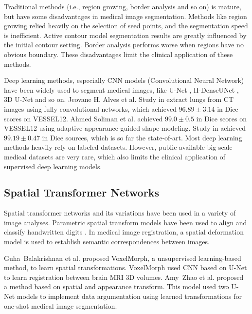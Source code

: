 \documentclass{article}
\begin{document}
Traditional methods (i.e., region growing, border analysis and so on) is mature, but have some disadvantages in medical image segmentation.
Methods like region growing \cite{adams1994seeded} relied heavily on the selection of seed points, and the segmentation speed is inefficient.
Active contour model \cite{kass1988snakes} segmentation results are greatly influenced by the initial contour setting.
Border analysis \cite{canny1987computational} performs worse when regions have no obvious boundary. 
These disadvantages limit the clinical application of these methods.

Deep learning methods, especially CNN models (Convolutional Neural Network) have been widely used to segment medical images, like U-Net \cite{ronneberger2015u}, H-DenseUNet \cite{li2018h}, 3D U-Net \cite{cciccek20163d} and so on. Jeovane H. Alves et al. Study in \cite{alves2018extracting} extract lungs from CT images using fully
convolutional networks, which achieved $96.89 \pm 3.14$ in Dice scores on VESSEL12. Ahmed Soliman et al. \cite{soliman2016accurate} achieved $99.0 \pm 0.5$ in Dice scores on VESSEL12 using adaptive appearance-guided shape modeling. Study in \cite{alves2018extracting} achieved $99.19 \pm 0.47$ in Dice sources, which is so far the state-of-art. Most deep learning methods heavily rely on labeled datasets. However, public available big-scale medical datasets are very rare, which also limits the clinical application of supervised deep learning models.

\subsection{Spatial Transformer Networks}
Spatial transformer networks \cite{jaderberg2015spatial} and its variations have been used in a variety of image analyses. Parametric spatial transform models have been used to align and classify handwritten digits \cite{hauberg2016dreaming, learned2005data, miller2000learning}. In medical image registration, a spatial deformation model is used to establish semantic correspondences between images.

Guha~Balakrishnan et al. \cite{balakrishnan2019tmi} proposed VoxelMorph, a unsupervised learning-based method, to learn spatial transformations. VoxelMorph used CNN based on U-Net to learn registration between brain MRI 3D volumes. Amy~Zhao et al. \cite{zhao2019data} proposed a method based on spatial and appearance transform. This model used two U-Net models to implement data argumentation using learned transformations for one-shot medical image segmentation. 
\end{document}
